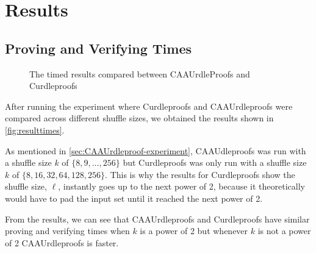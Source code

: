 \section{Results}\label{sec:results}
\subsection{Proving and Verifying Times}\label{subsec:results:provingverifying}

\begin{figure}[!htb]
    \centering
    \qquad
    \caption{The timed results compared between CAAUrdleProofs and Curdleproofs}%
    \label{fig:resulttimes}%
\end{figure}

After running the experiment where Curdleproofs and CAAUrdleproofs were compared across different shuffle sizes, we obtained the results shown in \autoref{fig:resulttimes}.

As mentioned in \autoref{sec:CAAUrdleproof-experiment}, CAAUdleproofs was run with a shuffle size $k$ of $\{8,9,\dots,256\}$ but Curdleproofs was only run with a shuffle size $k$ of $\{8,16,32,64,128,256\}$.
This is why the results for Curdleproofs show the shuffle size, $\ell$, instantly goes up to the next power of 2, because it theoretically would have to pad the input set until it reached the next power of 2.

From the results, we can see that CAAUrdleproofs and Curdleproofs have similar proving and verifying times when $k$ is a power of 2 but whenever $k$ is not a power of 2 CAAUrdleproofs is faster.

